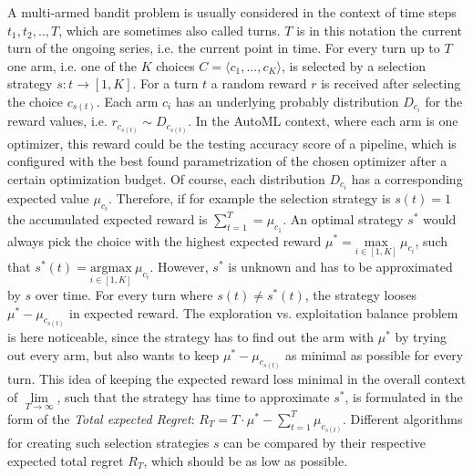 A multi-armed bandit problem is usually considered in the context of time steps $t_1, t_2, .., T$, which are sometimes also called turns.
$T$ is in this notation the current turn of the ongoing series, i.e. the current point in time.
For every turn up to $T$ one arm, i.e. one of the $K$ choices $C = \langle c_1, ..., c_K \rangle$, is selected by a selection strategy $s: t \rightarrow [1,K]$.\newline
For a turn $t$ a random reward $r$ is received after selecting the choice $c_{s(t)}$.
Each arm $c_i$ has an underlying probably distribution $D_{c_i}$ for the reward values, i.e. $r_{c_{s(t)}} \sim D_{c_{s(t)}}$.
In the AutoML context, where each arm is one optimizer, this reward could be the testing accuracy score of a pipeline, which is configured with the best found parametrization of the chosen optimizer after a certain optimization budget.\newline
Of course, each distribution $D_{c_i}$ has a corresponding expected value $\mu_{c_i}$.
Therefore, if for example the selection strategy is $s(t) = 1$ the accumulated expected reward is $\sum_{t=1}^T = \mu_{c_1}$.\newline
An optimal strategy $s^*$ would always pick the choice with the highest expected reward $\mu^* = \underset{i \in [1,K]}{\mathrm{max}} \> \mu_{c_i}$, such that $s^*(t) =\underset{i \in [1,K]}{\mathrm{argmax}} \> \mu_{c_i}$.
However, $s^*$ is unknown and has to be approximated by $s$ over time.\newline
For every turn where $s(t) \neq s^*(t)$, the strategy looses $\mu^* - \mu_{c_{s(t)}}$ in expected reward.
The exploration vs. exploitation balance problem is here noticeable, since the strategy has to find out the arm with $\mu^*$ by trying out every arm, but also wants to keep $\mu^* - \mu_{c_{s(t)}}$ as minimal as possible for every turn.
This idea of keeping the expected reward loss minimal in the overall context of $\underset{T \rightarrow \infty}{\lim}$, such that the strategy has time to approximate $s^*$, is formulated in the form of the \textit{Total expected Regret}: $R_T = T \cdot \mu^* - \sum_{t=1}^{T} \mu_{c_{s(t)}}$.
Different algorithms for creating such selection strategies $s$ can be compared by their respective expected total regret $R_T$, which should be as low as possible.

